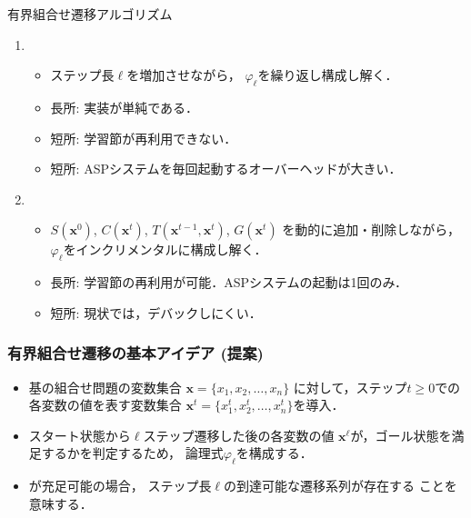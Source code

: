 \begin{frame}[shrink]{有界組合せ遷移アルゴリズム}
  \begin{enumerate}
  \item {}
    \begin{itemize}
    \item ステップ長$\ell$を増加させながら，
      $\varphi_{\ell}$を繰り返し構成し解く．
    \item 長所: 実装が単純である．
    \item 短所: 学習節が再利用できない．
    \item 短所: ASPシステムを毎回起動するオーバーヘッドが大きい．
    \end{itemize}
  \item {}
    \begin{itemize}
    \item $S(\bm{x}^{0})$, $C(\bm{x}^{t})$,
      $T(\bm{x}^{t-1},\bm{x}^{t})$, $G(\bm{x}^{t})$
      を動的に追加・削除しながら，$\varphi_{\ell}$をインクリメンタルに構成し解く．
    \item 長所: 学習節の再利用が可能．ASPシステムの起動は1回のみ．
    \item 短所: 現状では，デバックしにくい．
    \end{itemize}
  \end{enumerate}
  \end{frame}
\begin{frame}
  \frametitle{有界組合せ遷移の基本アイデア (提案)}
  \begin{itemize}
  \item 基の組合せ問題の変数集合
    $\bm{x} = \{x_1,x_2,\ldots,x_n\}$
    に対して，ステップ$t\geq 0$での各変数の値を表す変数集合
    $\bm{x}^{t} = \{x_1^t,x_2^t,\ldots,x_n^t\}$を導入．
  \item スタート状態から$\ell$ステップ遷移した後の各変数の値
    $\bm{x}^{\ell}$が，ゴール状態を満足するかを判定するため，
    論理式$\varphi_{\ell}$を構成する．
  \end{itemize}
  \begin{itemize}
  \item \bm{$\varphi_{\ell}$}が充足可能の場合，
    ステップ長$\ell$の到達可能な遷移系列が存在する
    ことを意味する．
  \end{itemize}
\end{frame}

